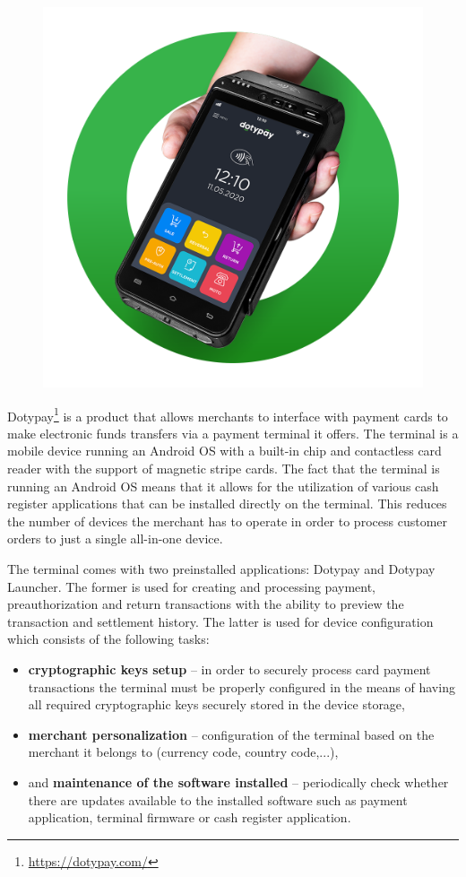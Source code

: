 \documentclass[12pt, a4paper]{article}
\begin{document}
\begin{figure}
    \centering
    \includegraphics[width=.37\textwidth]{img/dotypay-payment-terminal.png}
\end{figure}

Dotypay\footnote{\url{https://dotypay.com/}} is a product that allows merchants to interface with payment cards to make electronic funds transfers via a payment terminal it offers.
The terminal is a mobile device running an Android OS with a built-in chip and contactless card reader with the support of magnetic stripe cards.
The fact that the terminal is running an Android OS means that it allows for the utilization of various cash register applications that can be installed directly on the terminal. 
This reduces the number of devices the merchant has to operate in order to process customer orders to just a single all-in-one device.

The terminal comes with two preinstalled applications: Dotypay and Dotypay Launcher. The former is used for creating and processing payment, preauthorization and return transactions with the ability to preview the transaction and settlement history. The latter is used for device configuration which consists of the following tasks:

\begin{itemize}
    \item \textbf{cryptographic keys setup} -- in order to securely process card payment transactions the terminal must be properly configured in the means of having all required cryptographic keys securely stored in the device storage,
    \item \textbf{merchant personalization} -- configuration of the terminal based on the merchant it belongs to (currency code, country code,...),
    \item and \textbf{maintenance of the software installed} -- periodically check whether there are updates available to the installed software such as payment application, terminal firmware or cash register application.

\end{itemize}
\end{document}
